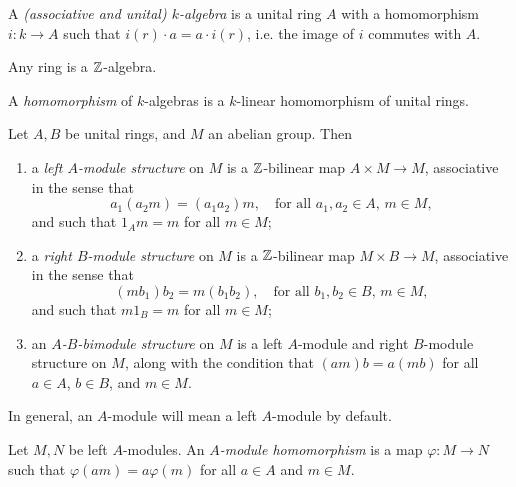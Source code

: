 \begin{definition}
  A \emph{(associative and unital) $k$-algebra}
  is a unital ring $A$ with a homomorphism
  $i : k \to A$ such that
  $i(r) \cdot a = a \cdot i(r)$, i.e. the
  image of $i$ commutes with $A$.
\end{definition}

\begin{example}
  Any ring is a $\mathbb{Z}$-algebra.
\end{example}

\begin{definition}
  A \emph{homomorphism} of $k$-algebras is a
  $k$-linear homomorphism of unital rings.
\end{definition}

\begin{definition}
  Let $A, B$ be unital rings, and $M$ an
  abelian group. Then
  \begin{enumerate}
    \item a \emph{left $A$-module structure}
      on $M$ is a $\mathbb{Z}$-bilinear map
      $A \times M \to M$, associative in
      the sense that
      \[
        a_1(a_2 m) = (a_1 a_2) m, \quad
        \text{for all } a_1, a_2 \in A,\, m \in M,
      \]
      and such that $1_A m = m$ for all $m \in M$;
    \item a \emph{right $B$-module structure}
      on $M$ is a $\mathbb{Z}$-bilinear map
      $M \times B \to M$, associative in
      the sense that
      \[
        (m b_1) b_2 = m (b_1 b_2), \quad
        \text{for all } b_1, b_2 \in B,\, m \in M,
      \]
      and such that $m 1_B = m$ for all $m \in M$;
    \item an \emph{$A$-$B$-bimodule structure}
      on $M$ is a left $A$-module and
      right $B$-module structure on $M$,
      along with the condition that
      $(am) b = a(mb)$ for all
      $a \in A$, $b \in B$, and $m \in M$.
  \end{enumerate}
\end{definition}

\begin{remark}
In general, an $A$-module will mean a left $A$-module by default.
\end{remark}

\begin{definition}
  Let $M, N$ be left $A$-modules.
  An \emph{$A$-module homomorphism} is a map
  $\varphi : M \to N$ such that
  $\varphi(am) = a \varphi(m)$ for all
  $a \in A$ and $m \in M$.
\end{definition}

